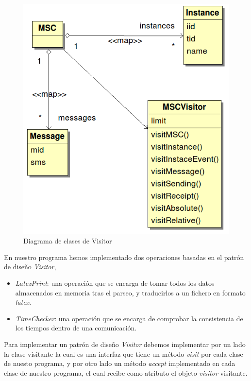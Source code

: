 \begin{figure}
  \centering 
  \includegraphics[scale=0.5]{./images/diag_visitor.png}
  \caption{Diagrama de clases de Visitor}
  \label{fig:diagvisitor}
\end{figure}

En nuestro programa hemos implementado dos operaciones basadas en el
patrón de diseño \textit{Visitor},
\begin{itemize}
\item \textit{LatexPrint}: una operación que se encarga de tomar todos
  los datos almacenados en memoria tras el parseo, y traducirlos a un
  fichero en formato \textit{latex}.
\item \textit{TimeChecker}: una operación que se encarga de comprobar
  la consistencia de los tiempos dentro de una comunicación. 
\end{itemize}

Para implementar un patrón de diseño \textit{Visitor} debemos
implementar por un lado la clase visitante la cual es una interfaz que
tiene un método \textit{visit} por cada clase de nuesto programa, y
por otro lado un método \textit{accept} implementado en cada clase de
nuestro programa, el cual recibe como atributo el objeto
\textit{visitor} visitante.

